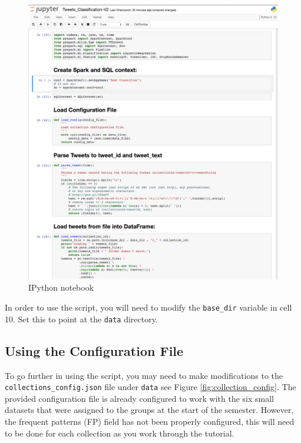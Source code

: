 \begin{figure}[th!]
	\centering
	\includegraphics[width=\textwidth]{figures/IPython_Tweet_Classification}
    \caption{IPython notebook}\label{fig:ipy_notebook}
\end{figure}

In order to use the script, you will need to modify the \texttt{base\_dir} variable in cell 10. Set this to point at the \texttt{data} directory.

\subsection{Using the Configuration File}

To go further in using the script, you may need to make modifications to the \texttt{collections\_config.json} file under \texttt{data} see Figure \ref{fig:collection_config}. The provided configuration file is already configured to work with the six small datasets that were assigned to the groups at the start of the semester. However, the frequent patterns (FP) field has not been properly configured, this will need to be done for each collection as you work through the tutorial.

